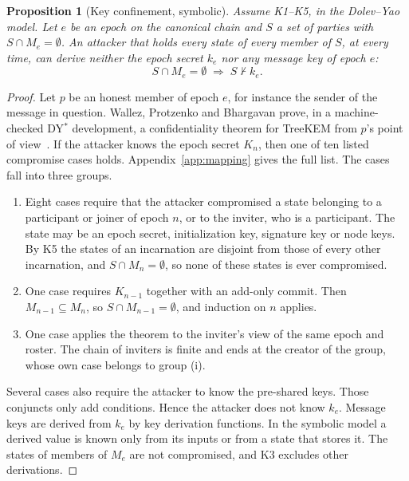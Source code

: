 \documentclass[aps,prx,reprint,superscriptaddress,nofootinbib,floatfix]{revtex4-2}
\newtheorem{proposition}{Proposition}
\theoremstyle{remark}
\newcommand{\roster}{M}
\newcommand{\derives}{\vdash}
\begin{document}
\begin{proposition}[Key confinement, symbolic]\label{prop:Ksym}
Assume K1--K5, in the Dolev--Yao model. Let $e$ be an epoch on the canonical chain and $S$ a set of parties with $S\cap\roster_e=\emptyset$. An attacker that holds every state of every member of $S$, at every time, can derive neither the epoch secret $k_e$ nor any message key of epoch $e$:
\begin{equation}
S\cap\roster_e=\emptyset\;\Longrightarrow\; S\not\derives k_e .
\label{eq:Ksym}
\end{equation}
\end{proposition}
\begin{proof}
Let $p$ be an honest member of epoch $e$, for instance the sender of the message in question. Wallez, Protzenko and Bhargavan prove, in a machine-checked DY$^\ast$ development, a confidentiality theorem for TreeKEM from $p$'s point of view~\cite{treekem-fstar,wallez-thesis}. If the attacker knows the epoch secret $K_n$, then one of ten listed compromise cases holds. Appendix~\ref{app:mapping} gives the full list. The cases fall into three groups.
\begin{enumerate}
\item[(i)] Eight cases require that the attacker compromised a state belonging to a participant or joiner of epoch $n$, or to the inviter, who is a participant. The state may be an epoch secret, initialization key, signature key or node keys. By K5 the states of an incarnation are disjoint from those of every other incarnation, and $S\cap\roster_n=\emptyset$, so none of these states is ever compromised.
\item[(ii)] One case requires $K_{n-1}$ together with an add-only commit. Then $\roster_{n-1}\subseteq\roster_n$, so $S\cap\roster_{n-1}=\emptyset$, and induction on $n$ applies.
\item[(iii)] One case applies the theorem to the inviter's view of the same epoch and roster. The chain of inviters is finite and ends at the creator of the group, whose own case belongs to group (i).
\end{enumerate}
Several cases also require the attacker to know the pre-shared keys. Those conjuncts only add conditions. Hence the attacker does not know $k_e$. Message keys are derived from $k_e$ by key derivation functions. In the symbolic model a derived value is known only from its inputs or from a state that stores it. The states of members of $\roster_e$ are not compromised, and K3 excludes other derivations.
\end{proof}
\end{document}
